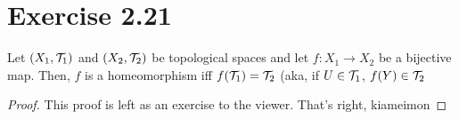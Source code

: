 \documentclass{article}
\begin{document}
\section{Exercise 2.21}
\begin{proposition}
\label{book:ex:2.21}
Let $(X_1, \mathcal{T}_1)$ and $(X_2, \mathcal{T}_2)$ be topological spaces and let $f: X_1 \to X_2$ be a bijective map. Then,
$f$ is a homeomorphism iff $f(\mathcal{T}_1) = \mathcal{T}_2$ (aka,
if $U \in \mathcal{T}_1$, $f(Y) \in \mathcal{T}_2$
\end{proposition}

\begin{proof}
    This proof is left as an exercise to the viewer.
    That's right, kiameimon
\end{proof}
\end{document}
